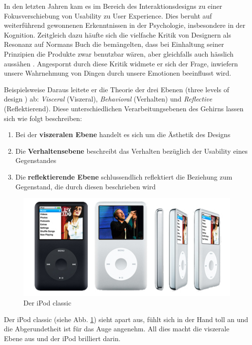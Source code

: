 \documentclass[parskip,headsepline, headtopline, %
footsepline, oneside, 12pt, headings=small]{scrreprt}
\begin{document}
In den letzten Jahren kam es im Bereich des Interaktionsdesigns zu einer Fokusverschiebung von Usability zu User Experience. Dies beruht auf weiterführend gewonnenen Erkenntnissen in der Psychologie, insbesondere in der Kognition. Zeitgleich dazu häufte sich die vielfache Kritik von Designern als Resonanz auf Normans Buch die bemängelten, dass bei Einhaltung seiner Prinzipien die Produkte zwar benutzbar wären, aber gleichfalls auch hässlich aussähen \cite[S. 8]{don2}. Angespornt durch diese Kritik widmete er sich der Frage, inwiefern unsere Wahrnehmung von Dingen durch unsere Emotionen beeinflusst wird.

Beispielsweise
Daraus leitete er die Theorie der drei Ebenen (three levels of design \cite[siehe Kapitel 3]{don2}) ab: \textit{Visceral} (Viszeral), \textit{Behavioral} (Verhalten) und \textit{Reflective} (Reflektierend). Diese unterschiedlichen Verarbeitungsebenen des Gehirns lassen sich wie folgt beschreiben:
\begin{enumerate}
\item Bei der \textbf{viszeralen Ebene} handelt es sich um die Ästhetik des Designs
\item Die \textbf{Verhaltensebene} beschreibt das Verhalten bezüglich der Usability eines Gegenstandes
\item Die \textbf{reflektierende Ebene} schlussendlich reflektiert die Beziehung zum Gegenstand, die durch diesen beschrieben wird
\end{enumerate}

\begin{figure}
\center
\includegraphics[width=.7\textwidth]{images/ipod-classic}
\caption{Der iPod classic \cite{ipod}}
\label{fig:ipod}
\end{figure}


Der iPod classic (siehe Abb. \ref{fig:ipod}) sieht apart aus, fühlt sich in der Hand toll an und die Abgerundetheit ist für das Auge angenehm. All dies macht die viszerale Ebene aus und der iPod brilliert darin.
\end{document}
